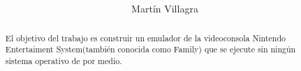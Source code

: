 \documentclass[a4paper,12pt,spanish,notitlepage]{report}
\begin{document}
\title{
}
\author{Martín Villagra}
\maketitle
\vspace{1cm}
\vspace{\fill}
\begin{abstract}\centering
El objetivo del trabajo es construir un emulador de la videoconsola Nintendo Entertaiment System(también conocida como Family) que se ejecute sin ningún sistema operativo de por medio.
\end{abstract}
\raggedright
\tableofcontents




\end{document}
